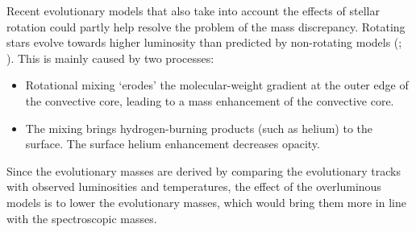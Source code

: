Recent evolutionary models that also take into account the effects of
stellar rotation could partly help resolve the problem of the mass
discrepancy. Rotating stars evolve towards higher luminosity than
predicted by non-rotating models (\cite{ma:98}; \cite{me:98}). This
is mainly caused by two processes:
%
\begin{itemize}
\item	Rotational mixing `erodes' the molecular-weight gradient at
	the outer edge of the convective core, leading to a mass
	enhancement of the convective core.
\item	The mixing brings hydrogen-burning products (such as helium)
	to the surface. The surface helium enhancement decreases
	opacity.
\end{itemize}
%
Since the evolutionary masses are derived by comparing the
evolutionary tracks with observed luminosities and temperatures, the
effect of the overluminous models is to lower the evolutionary masses,
which would bring them more in line with the spectroscopic masses.

